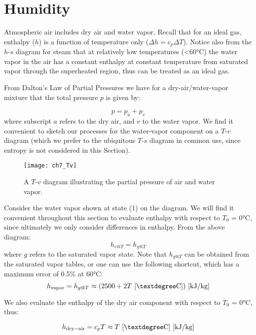 \section{Humidity}
Atmospheric air includes dry air and water vapor. Recall that for an ideal gas, enthalpy ($h$) is a function of temperature only ($\Delta h = c_p\Delta T$). Notice also from the $h$-$s$ diagram for steam that at relatively low temperatures (<60°C) the water vapor in the air has a constant enthalpy at constant temperature from saturated vapor through the superheated region, thus can be treated as an ideal gas.

From Dalton's Law of Partial Pressures we have for a dry-air/water-vapor mixture that the total pressure $p$ is given by:

\begin{equation}
  p = p_a + p_v
\end{equation}
where subscript $a$ refers to the dry air, and $v$ to the water vapor.
We find it convenient to sketch our processes for the water-vapor component on a $T$-$v$ diagram (which we prefer to the ubiquitous $T$-$s$ diagram in common use, since entropy is not considered in this Section).

\begin{figure}[H]
  \centering
  \texttt{[image: ch7\_Tv]}
  \caption{A $T$-$v$ diagram illustrating the partial pressure of air and water vapor.}
  \label{fig:ch7_Tv}
\end{figure}

Consider the water vapor shown at state (1) on the diagram. We will find it convenient throughout this section to evaluate enthalpy with respect to $T_0$ = 0°C, since ultimately we only consider differences in enthalpy. From the above diagram:
\begin{equation}
  h_{v@T} = h_{g@T}
\end{equation}
where $g$ refers to the saturated vapor state.
Note that $h_{g@T}$ can be obtained from the saturated vapor tables, or one can use the following shortcut, which has a maximum error of 0.5\% at 60°C:
\begin{equation}
  h_{\rm vapor} = h_{g@T} \approx (2500 + 2 T\ {\rm [°C]})\ [\rm kJ/kg]
\end{equation}

We also evaluate the enthalpy of the dry air component with respect to $T_0$ = 0°C, thus:

\begin{equation}
  h_{\rm dry-air} = c_p T\approx T\ {\rm [°C]}\ [\rm kJ/kg]
\end{equation}

